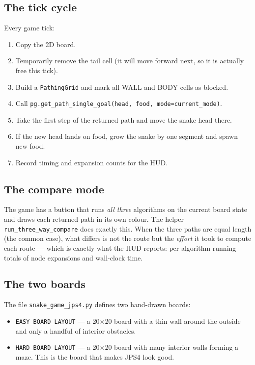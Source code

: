 \documentclass[11pt,a4paper]{article}
\begin{document}
\subsection{The tick cycle}

Every game tick:

\begin{enumerate}[leftmargin=20pt,itemsep=2pt]
  \item Copy the 2D board.
  \item Temporarily remove the tail cell (it will move forward next, so it is actually free this tick).
  \item Build a \texttt{PathingGrid} and mark all WALL and BODY cells as blocked.
  \item Call \texttt{pg.get\_path\_single\_goal(head, food, mode=current\_mode)}.
  \item Take the first step of the returned path and move the snake head there.
  \item If the new head lands on food, grow the snake by one segment and spawn new food.
  \item Record timing and expansion counts for the HUD.
\end{enumerate}

\subsection{The compare mode}

The game has a button that runs \emph{all three} algorithms on the current board state and draws each returned path in its own colour. The helper \texttt{run\_three\_way\_compare} does exactly this. When the three paths are equal length (the common case), what differs is not the route but the \emph{effort} it took to compute each route --- which is exactly what the HUD reports: per-algorithm running totals of node expansions and wall-clock time.

\subsection{The two boards}

The file \texttt{snake\_game\_jps4.py} defines two hand-drawn boards:

\begin{itemize}[leftmargin=20pt,itemsep=2pt]
  \item \texttt{EASY\_BOARD\_LAYOUT} --- a 20$\times$20 board with a thin wall around the outside and only a handful of interior obstacles.
  \item \texttt{HARD\_BOARD\_LAYOUT} --- a 20$\times$20 board with many interior walls forming a maze. This is the board that makes JPS4 look good.
\end{itemize}
\end{document}
